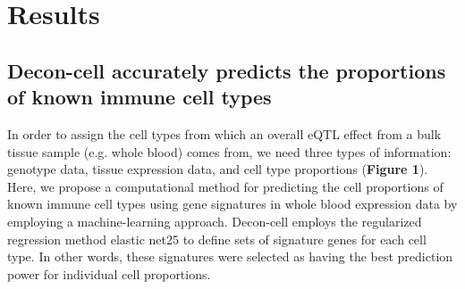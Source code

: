 \section{Results}
\subsection{Decon-cell accurately predicts the proportions of known immune cell types}
In order to assign the cell types from which an overall eQTL effect from a bulk tissue sample (e.g. whole blood) comes from, we need three types of information: genotype data, tissue expression data, and cell type proportions (\textbf{Figure 1}). Here, we propose a computational method for predicting the cell proportions of known immune cell types using gene signatures in whole blood expression data by employing a machine-learning approach. Decon-cell employs the regularized regression method elastic net25 to define sets of signature genes for each cell type. In other words, these signatures were selected as having the best prediction power for individual cell proportions. 

